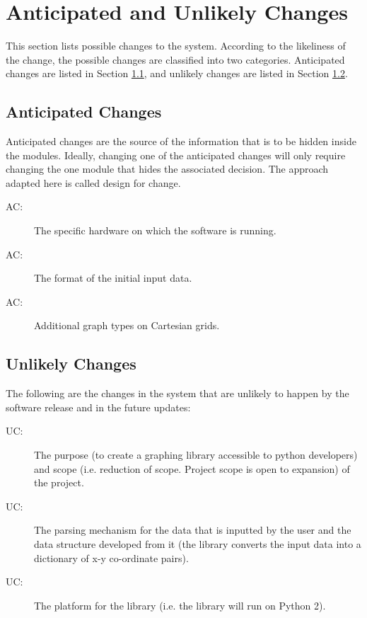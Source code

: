 \documentclass[12pt, titlepage]{article}
\newcounter{acnum}
\newcommand{\actheacnum}{AC\theacnum}
\newcounter{ucnum}
\newcommand{\uctheucnum}{UC\theucnum}
\begin{document}
\section{Anticipated and Unlikely Changes} \label{SecChange}

This section lists possible changes to the system. According to the likeliness
of the change, the possible changes are classified into two
categories. Anticipated changes are listed in Section \ref{SecAchange}, and
unlikely changes are listed in Section \ref{SecUchange}.

\subsection{Anticipated Changes} \label{SecAchange}

Anticipated changes are the source of the information that is to be hidden
inside the modules. Ideally, changing one of the anticipated changes will only
require changing the one module that hides the associated decision. The approach
adapted here is called design for
change.

\begin{description}
\item[ \actheacnum \label{acHardware}:] The specific
  hardware on which the software is running.
\item[ \actheacnum \label{acInput}:] The format of the
  initial input data.
\item [ \actheacnum \label{acGraphType}:] Additional graph types on Cartesian grids.
\end{description}

\subsection{Unlikely Changes} \label{SecUchange}

The following are the changes in the system that are unlikely to happen by the software release and in the future updates:

\begin{description}
\item[ \uctheucnum \label{ucIO}:] The purpose (to create a graphing library accessible to python developers) and scope (i.e. reduction of scope. Project scope is open to expansion) of the project.
\item[ \uctheucnum \label{ucInput}:] The parsing mechanism for the data that is inputted by the user and the data structure developed from it (the library converts the input data into a dictionary of x-y co-ordinate pairs).
\item[ \uctheucnum \label{ucInput}:]The platform for the library (i.e. the library will run on Python 2).
\end{description}
\end{document}
